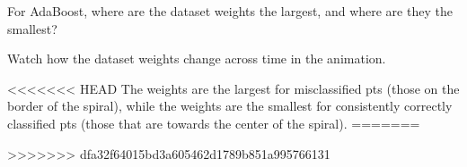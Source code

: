 
\begin{problem}[2]
    For AdaBoost, where are the dataset weights the largest, and where are they the smallest?
\end{problem}
\begin{hint}
    Watch how the dataset weights change across time in the animation.
\end{hint}
\begin{solution}
<<<<<<< HEAD
    The weights are the largest for misclassified pts (those on the border of the spiral), while the weights are the smallest for consistently correctly classified pts (those that are towards the center of the spiral).
=======
   
>>>>>>> dfa32f64015bd3a605462d1789b851a995766131
\end{solution}

